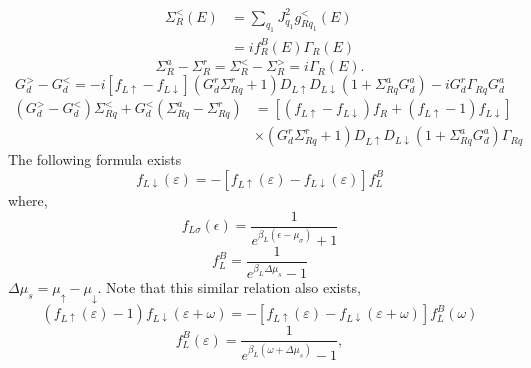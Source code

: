 \documentclass[aps,prb,onecolumn,amssymb,amsmath,superscriptaddress]{revtex4-1}
\begin{document}
\begin{equation}
\begin{split}
\Sigma_{R}^{<}(E) &=  \sum_{q_{1}}J_{q_{1}}^{2} g_{Rq_{1}}^{<}(E) \\
&= if_{R}^{B}(E) \Gamma_{R}(E)
\end{split}
\end{equation}
\begin{equation}
\Sigma_{R}^{a} - \Sigma_{R}^{r} = \Sigma_{R}^{<} - \Sigma_{R}^{>} = i\Gamma_{R}(E).
\end{equation}
\begin{equation}
G_{d}^{>}-G_{d}^{<}=-i\left[f_{L \uparrow}-f_{L \downarrow}\right]\left(G_{d}^{r} \Sigma_{R q}^{r}+1\right) D_{L \uparrow} D_{L \downarrow}\left(1+\Sigma_{R q}^{a} G_{d}^{a}\right)-i G_{d}^{r} \Gamma_{R q} G_{d}^{a}
\end{equation}
\begin{equation}
\begin{aligned}
\left(G_{d}^{>}-G_{d}^{<}\right) \Sigma_{R q}^{<}+G_{d}^{<}\left(\Sigma_{R q}^{a}-\Sigma_{R q}^{r}\right) &=\left[\left(f_{L \uparrow}-f_{L \downarrow}\right) f_{R}+\left(f_{L \uparrow}-1\right) f_{L \downarrow}\right] \\ & \times\left(G_{d}^{r} \Sigma_{R q}^{r}+1\right) D_{L \uparrow} D_{L \downarrow}\left(1+\Sigma_{R q}^{a} G_{d}^{a}\right) \Gamma_{R q} 
\end{aligned}
\label{eq:diff}
\end{equation}
The following formula exists
\begin{equation}
[f_{L \uparrow}(\varepsilon)-1] f_{L \downarrow}(\varepsilon) =-[f_{L \uparrow}(\varepsilon) -f_{L \downarrow}(\varepsilon)] f_{L}^{B}
\end{equation}
where,
\begin{equation}
f_{L \sigma}(\epsilon)=\frac{1}{e^{\beta_{L}(\epsilon-\mu_{\sigma})}+1}
\end{equation}
\begin{equation}
f_{L}^{B}= \frac{1}{e^{\beta_{L}\Delta \mu_{s}}-1 }
\end{equation}
$\Delta\mu_{s}=\mu_{\uparrow}-\mu_{\downarrow}$. Note that this similar relation also exists,
\begin{equation}
\left(f_{L \uparrow}(\varepsilon)-1\right) f_{L \downarrow}(\varepsilon+\omega)=-[f_{L \uparrow}(\varepsilon) - f_{L \downarrow}(\varepsilon+\omega)] f_{L}^{B}(\omega)
\end{equation}
\begin{equation}
f_{L}^{B}(\varepsilon) = \frac{1}{e^{\beta_{L}(\omega+\Delta \mu_{s})}-1 },
\end{equation}
\end{document}
